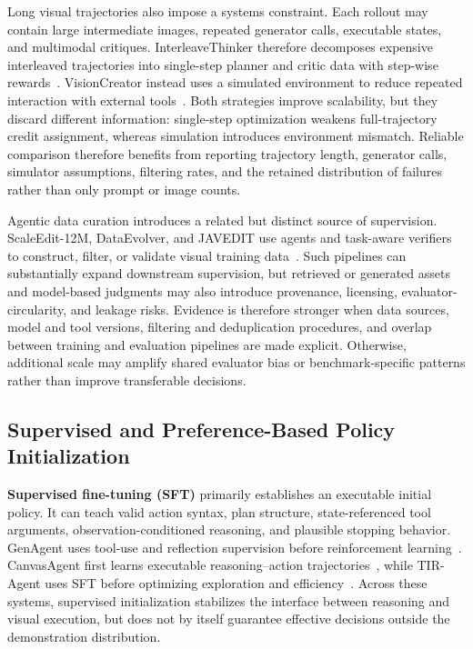 Long visual trajectories also impose a systems constraint. Each rollout may contain large intermediate images, repeated generator calls, executable states, and multimodal critiques. InterleaveThinker therefore decomposes expensive interleaved trajectories into single-step planner and critic data with step-wise rewards~\cite{avg260613679}. VisionCreator instead uses a simulated environment to reduce repeated interaction with external tools~\cite{avg260302681}. Both strategies improve scalability, but they discard different information: single-step optimization weakens full-trajectory credit assignment, whereas simulation introduces environment mismatch. Reliable comparison therefore benefits from reporting trajectory length, generator calls, simulator assumptions, filtering rates, and the retained distribution of failures rather than only prompt or image counts.

Agentic data curation introduces a related but distinct source of supervision. ScaleEdit-12M, DataEvolver, and JAVEDIT use agents and task-aware verifiers to construct, filter, or validate visual training data~\cite{avg260320644,avg260603168,avg260631537}. Such pipelines can substantially expand downstream supervision, but retrieved or generated assets and model-based judgments may also introduce provenance, licensing, evaluator-circularity, and leakage risks. Evidence is therefore stronger when data sources, model and tool versions, filtering and deduplication procedures, and overlap between training and evaluation pipelines are made explicit. Otherwise, additional scale may amplify shared evaluator bias or benchmark-specific patterns rather than improve transferable decisions.

\subsection{Supervised and Preference-Based Policy Initialization}
\label{subsec:policy-initialization}

\textbf{Supervised fine-tuning (SFT)} primarily establishes an executable initial policy. It can teach valid action syntax, plan structure, state-referenced tool arguments, observation-conditioned reasoning, and plausible stopping behavior. GenAgent uses tool-use and reflection supervision before reinforcement learning~\cite{jiang2026genagent}. CanvasAgent first learns executable reasoning--action trajectories~\cite{avg260705465}, while TIR-Agent uses SFT before optimizing exploration and efficiency~\cite{avg260327742}. Across these systems, supervised initialization stabilizes the interface between reasoning and visual execution, but does not by itself guarantee effective decisions outside the demonstration distribution.

